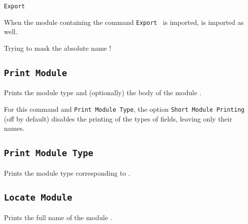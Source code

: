\begin{Variants}
\item{\tt Export {\qualid}}

  When the module containing the command {\tt Export {\qualid}} is
  imported, {\qualid} is imported as well.
\end{Variants}

\begin{ErrMsgs}
  \item {}
\end{ErrMsgs}

\begin{Warnings}
  \item Trying to mask the absolute name {\qualid} !
\end{Warnings}

\subsection{\tt Print Module {\ident}
 }

Prints the module type and (optionally) the body of the module {\ident}.

For this command and {\tt Print Module Type}, the option {\tt Short
  Module Printing} (off by default) disables the printing of the types of fields,
leaving only their names.

\subsection{\tt Print Module Type {\ident}
}

Prints the module type corresponding to {\ident}.

\subsection{\tt Locate Module {\qualid}
}

Prints the full name of the module {\qualid}.


